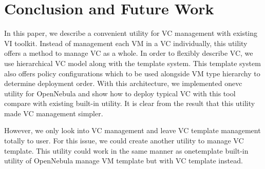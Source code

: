 \documentclass[conference]{IEEEtran}
\begin{document}
\section{Conclusion and Future Work}
In this paper, we describe a convenient utility for VC management with existing VI toolkit.
Instead of management each VM in a VC individually, this utility offers a method to manage VC as a whole.
In order to flexibly describe VC, we use hierarchical VC model along with the template system.
This template system also offers policy configurations which to be used alongside VM type hierarchy to determine deployment order.
With this architecture, we implemented onevc utility for OpenNebula and show how to deploy typical VC with this tool compare with existing built-in utility.
It is clear from the result that this utility made VC management simpler.

However, we only look into VC management and leave VC template management totally to user.
For this issue, we could create another utility to manage VC template.
This utility could work in the same manner as onetemplate built-in utility of OpenNebula manage VM template but with VC template instead.









\end{document}
